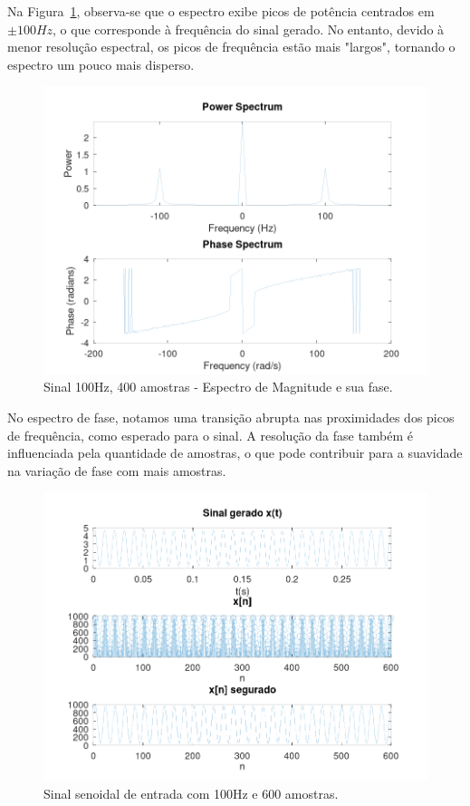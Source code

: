 Na Figura~\ref{fig:spec-signal-100-400}, observa-se que o espectro exibe picos de potência centrados em $\pm100Hz$, o que corresponde à frequência do sinal gerado. No entanto, devido à menor resolução espectral, os picos de frequência estão mais "largos", tornando o espectro um pouco mais disperso.

\begin{figure}[h]
    \centering
    \includegraphics[width=1\linewidth]{03_results/assets/sin__100Hz_fs2k_SPECTRUM_400smp}
    \caption{Sinal 100Hz, 400 amostras - Espectro de Magnitude e sua fase.}
    \label{fig:spec-signal-100-400}
\end{figure}

No espectro de fase, notamos uma transição abrupta nas proximidades dos picos de frequência, como esperado para o sinal. A resolução da fase também é influenciada pela quantidade de amostras, o que pode contribuir para a suavidade na variação de fase com mais amostras.

\begin{figure}[h]
    \centering
    \includegraphics[width=1\linewidth]{03_results/assets/sin__100Hz_fs2k_SIGNAL_600smp.png}
    \caption{Sinal senoidal de entrada com 100Hz e 600 amostras.}
    \label{fig:input-signal-100-600}
\end{figure}

